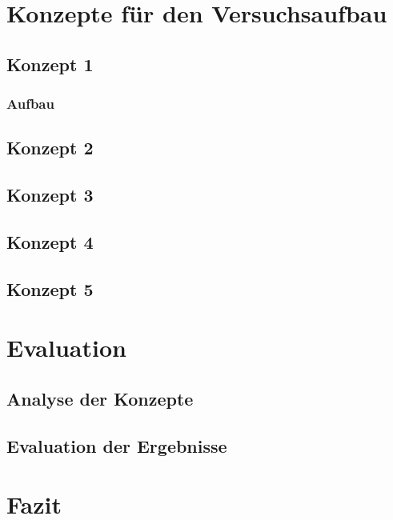 \chapter{Konzepte f\"{u}r den Versuchsaufbau}\label{ch:implementation}
\section{Konzept 1}
\subsection{Aufbau}
\section{Konzept 2}
\section{Konzept 3}
\section{Konzept 4}
\section{Konzept 5}


\chapter{Evaluation}\label{ch:conclusion}

\section{Analyse der Konzepte}
\section{Evaluation der Ergebnisse}

\chapter{Fazit}\label{ch:conclusion}


